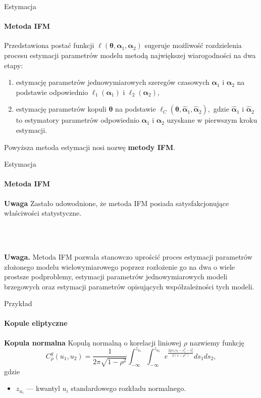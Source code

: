 \documentclass[a4paper, 11pt]{beamer}
\begin{document}
	\begin{frame}{Estymacja}
		\framesubtitle{Metoda IFM}
		
		Przedstawiona postać funkcji $\ell\left(\boldsymbol{\theta}, \boldsymbol{\alpha}_1, \boldsymbol{\alpha}_2\right)$
		sugeruje możliwość rozdzielenia procesu estymacji parametrów modelu metodą największej wiarogodności na dwa etapy:
		\begin{enumerate}
			\item estymację parametrów jednowymiarowych szeregów czasowych $\boldsymbol{\alpha}_1$ i $\boldsymbol{\alpha}_2$
				na podstawie odpowiednio $\ell_1\left(\boldsymbol{\alpha}_1\right)$ i $\ell_2\left(\boldsymbol{\alpha}_2\right),$
			\item estymację parametrów kopuli $\boldsymbol{\theta}$ na podstawie
				$\ell_C\left(\boldsymbol{\theta}, \hat{\boldsymbol{\alpha}}_1, \hat{\boldsymbol{\alpha}}_2\right),$ gdzie
				$\hat{\boldsymbol{\alpha}}_1$ i $\hat{\boldsymbol{\alpha}}_2$ to estymatory parametrów odpowiednio
				$\boldsymbol{\alpha}_1$ i $\boldsymbol{\alpha}_2$ uzyskane w pierwszym kroku estymacji.
		\end{enumerate}
		
		Powyższa metoda estymacji nosi nozwę \textbf{metody IFM}.
	\end{frame}
	
	\begin{frame}{Estymacja}
		\framesubtitle{Metoda IFM}
		\begin{alert}{\textbf{Uwaga}}
			Zastało udowodnione, że metoda IFM posiada satysfakcjonujące właściwości statystyczne.
		\end{alert}
		\\~\\
		\begin{alert}{\textbf{Uwaga.}}
			Metoda IFM pozwala stanowczo uprościć proces estymacji parametrów złożonego modelu wielowymiarowego
			poprzez rozłożenie go na dwa o wiele prostsze podproblemy, estymacji parametrów jednowymiarowych modeli
			brzegowych oraz estymacji parametrów opisujących współzależności tych modeli.
		\end{alert}
	\end{frame}
	
	\begin{frame}{Przykład}
		\framesubtitle{Kopule eliptyczne}
		
		\begin{block}{\textbf{Kopula normalna}}
			Kopulą normalną o korelacji liniowej $\rho$ nazwiemy funkcję \[
				C_{\rho}^{g}\left(u_{1},u_{2}\right) = 
					\frac{1}{2\pi\sqrt{1-\rho^{2}}} \int_{-\infty}^{z_{u_{1}}} \int_{-\infty}^{z_{u_{2}}}
						e^{\frac{2\rho s_{1}s_{2}-s_{1}^{2}-s_{2}^{2}}{2\left(1-\rho^{2}\right)}}
					ds_{1}ds_{2},
			\] gdzie
			\begin{itemize}
				\item $z_{u_i}$ --- kwantyl $u_i$ standardowego rozkładu normalnego.
			\end{itemize}
		\end{block}
	\end{frame}
	
\end{document}
